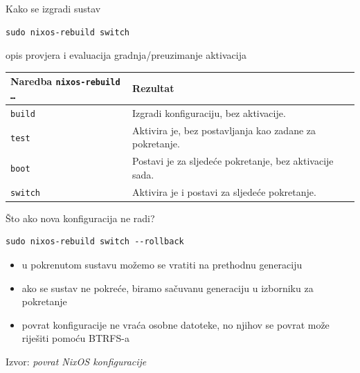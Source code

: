 \documentclass{beamer}
\begin{document}
\begin{frame}[fragile]{Kako se izgradi sustav}
	\begin{lstlisting}
sudo nixos-rebuild switch
\end{lstlisting}

	\begin{center}
		\small opis \textrightarrow{} provjera i evaluacija \textrightarrow{} gradnja/preuzimanje \textrightarrow{} aktivacija
	\end{center}

	{\small
	\renewcommand{\arraystretch}{1.2}
	\begin{tabular}{@{}l >{\raggedright\arraybackslash}p{7.0cm}@{}}
		\toprule
		\textbf{Naredba \texttt{nixos-rebuild \ldots}} & \textbf{Rezultat}                                       \\
		\midrule
		\texttt{build}                                 & Izgradi konfiguraciju, bez aktivacije.                  \\
		\texttt{test}                                  & Aktivira je, bez postavljanja kao zadane za pokretanje. \\
		\texttt{boot}                                  & Postavi je za sljedeće pokretanje, bez aktivacije sada. \\
		\texttt{switch}                                & Aktivira je i postavi za sljedeće pokretanje.           \\
		\bottomrule
	\end{tabular}}
\end{frame}

\begin{frame}[fragile]{Što ako nova konfiguracija ne radi?}
	\begin{lstlisting}
sudo nixos-rebuild switch --rollback
\end{lstlisting}

	\begin{itemize}
		\item u pokrenutom sustavu možemo se vratiti na prethodnu generaciju
		\item ako se sustav ne pokreće, biramo sačuvanu generaciju u izborniku za pokretanje
		\item povrat konfiguracije ne vraća osobne datoteke, no njihov se povrat može riješiti pomoću BTRFS-a
	\end{itemize}

	\vfill
	{\scriptsize Izvor: \emph{povrat NixOS konfiguracije} \cite{nixos-manual-rollback}}
\end{frame}
\end{document}
